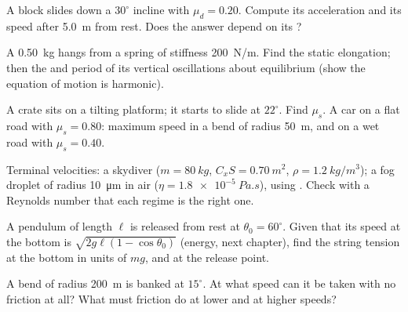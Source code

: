 \begin{exercise}[$\star$]\label{exo:b1:newton-dynamics:3}
A block slides down a $30^\circ$ incline with $\mu_d = 0.20$. Compute
its acceleration and its speed after \qty{5.0}{m} from rest. Does the
answer depend on its ?
\end{exercise}

\begin{exercise}[$\star$]\label{exo:b1:newton-dynamics:4}
A \qty{0.50}{kg}  hangs from a spring of stiffness \qty{200}{N/m}.
Find the static elongation; then the  and period of
its vertical oscillations about equilibrium (show the equation of
motion is harmonic).
\end{exercise}

\begin{exercise}[$\star\star$]\label{exo:b1:newton-dynamics:5}
A crate sits on a tilting platform; it starts to slide at $22^\circ$.
Find $\mu_s$. A car on a flat road with $\mu_s = 0.80$: maximum speed
in a bend of radius \qty{50}{m}, and on a wet road with $\mu_s = 0.40$.
\end{exercise}

\begin{exercise}[$\star\star$]\label{exo:b1:newton-dynamics:6}
Terminal velocities: a skydiver ($m = \qty{80}{kg}$, $C_xS = \qty{0.70}{m^2}$,
$\rho = \qty{1.2}{kg/m^3}$); a fog droplet of radius \qty{10}{\micro m}
in air ($\eta = \qty{1.8e-5}{Pa.s}$), using . Check with a
Reynolds number that each regime is the right one.
\end{exercise}

\begin{exercise}[$\star\star$]\label{exo:b1:newton-dynamics:7}
A pendulum of length $\ell$ is released from rest at $\theta_0 = 60^\circ$.
Given that its speed at the bottom is $\sqrt{2g\ell(1 - \cos\theta_0)}$
(energy, next chapter), find the string tension at the bottom in units
of $mg$, and at the release point.
\end{exercise}

\begin{exercise}[$\star\star$]\label{exo:b1:newton-dynamics:8}
A bend of radius \qty{200}{m} is banked at $15^\circ$. At what speed can
it be taken with no friction at all? What must friction do at lower and
at higher speeds?
\end{exercise}

